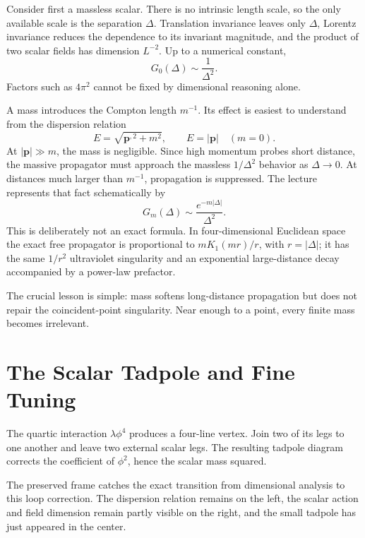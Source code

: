 Consider first a massless scalar. There is no intrinsic length scale, so the only available scale is the separation \(\Delta\). Translation invariance leaves only \(\Delta\), Lorentz invariance reduces the dependence to its invariant magnitude, and the product of two scalar fields has dimension \(L^{-2}\). Up to a numerical constant,
\begin{equation}
G_0(\Delta)\sim\frac{1}{\Delta^2}.
\end{equation}
Factors such as \(4\pi^2\) cannot be fixed by dimensional reasoning alone.

A mass introduces the Compton length \(m^{-1}\). Its effect is easiest to understand from the dispersion relation
\begin{equation}
E=\sqrt{\bm p^{,2}+m^2},
\qquad
E=|\bm p|\quad(m=0).
\end{equation}
At \(|\bm p|\gg m\), the mass is negligible. Since high momentum probes short distance, the massive propagator must approach the massless \(1/\Delta^2\) behavior as \(\Delta\to0\). At distances much larger than \(m^{-1}\), propagation is suppressed. The lecture represents that fact schematically by
\begin{equation}
G_m(\Delta)\sim \frac{e^{-m|\Delta|}}{\Delta^2}.
\end{equation}
This is deliberately not an exact formula. In four-dimensional Euclidean space the exact free propagator is proportional to \(mK_1(mr)/r\), with \(r=|\Delta|\); it has the same \(1/r^2\) ultraviolet singularity and an exponential large-distance decay accompanied by a power-law prefactor.

The crucial lesson is simple: mass softens long-distance propagation but does not repair the coincident-point singularity. Near enough to a point, every finite mass becomes irrelevant.

\section{The Scalar Tadpole and Fine Tuning}

The quartic interaction \(\lambda\phi^4\) produces a four-line vertex. Join two of its legs to one another and leave two external scalar legs. The resulting tadpole diagram corrects the coefficient of \(\phi^2\), hence the scalar mass squared.

The preserved frame catches the exact transition from dimensional analysis to this loop correction. The dispersion relation remains on the left, the scalar action and field dimension remain partly visible on the right, and the small tadpole has just appeared in the center.

